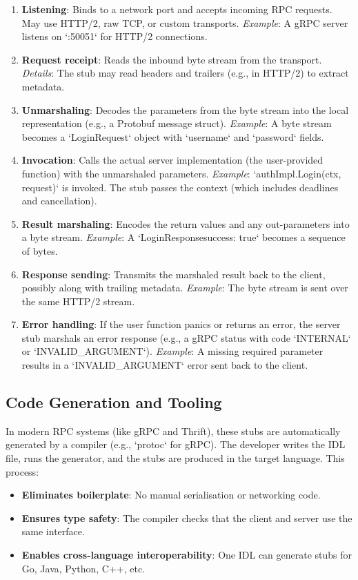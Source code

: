 \documentclass[10pt,a4paper]{article}
\begin{document}
\begin{enumerate}
    \item \textbf{Listening}: Binds to a network port and accepts incoming RPC requests. May use HTTP/2, raw TCP, or custom transports.  
        \textit{Example}: A gRPC server listens on `:50051` for HTTP/2 connections.

    \item \textbf{Request receipt}: Reads the inbound byte stream from the transport.  
        \textit{Details}: The stub may read headers and trailers (e.g., in HTTP/2) to extract metadata.

    \item \textbf{Unmarshaling}: Decodes the parameters from the byte stream into the local representation (e.g., a Protobuf message struct).  
        \textit{Example}: A byte stream becomes a `LoginRequest` object with `username` and `password` fields.

    \item \textbf{Invocation}: Calls the actual server implementation (the user-provided function) with the unmarshaled parameters.  
        \textit{Example}: `authImpl.Login(ctx, request)` is invoked. The stub passes the context (which includes deadlines and cancellation).

    \item \textbf{Result marshaling}: Encodes the return values and any out-parameters into a byte stream.  
        \textit{Example}: A `LoginResponse{success: true}` becomes a sequence of bytes.

    \item \textbf{Response sending}: Transmits the marshaled result back to the client, possibly along with trailing metadata.  
        \textit{Example}: The byte stream is sent over the same HTTP/2 stream.

    \item \textbf{Error handling}: If the user function panics or returns an error, the server stub marshals an error response (e.g., a gRPC status with code `INTERNAL` or `INVALID\_ARGUMENT`).  
        \textit{Example}: A missing required parameter results in a `INVALID\_ARGUMENT` error sent back to the client.
\end{enumerate}

\subsection{Code Generation and Tooling}
In modern RPC systems (like gRPC and Thrift), these stubs are automatically generated by a compiler (e.g., `protoc` for gRPC). The developer writes the IDL file, runs the generator, and the stubs are produced in the target language. This process:
\begin{itemize}
    \item \textbf{Eliminates boilerplate}: No manual serialisation or networking code.
    \item \textbf{Ensures type safety}: The compiler checks that the client and server use the same interface.
    \item \textbf{Enables cross-language interoperability}: One IDL can generate stubs for Go, Java, Python, C++, etc.
\end{itemize}
\end{document}
